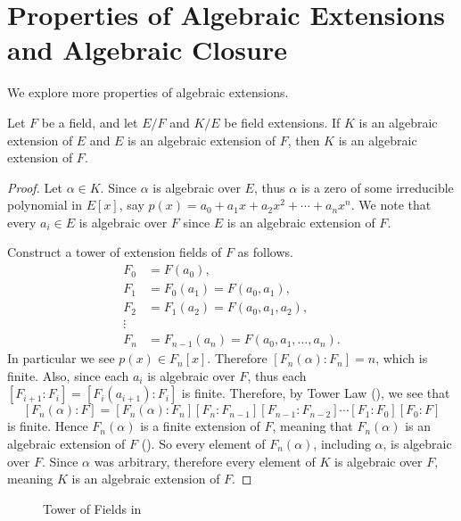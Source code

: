 \section{Properties of Algebraic Extensions and Algebraic Closure}
We explore more properties of algebraic extensions.
\begin{theorem}\label{thrm-algebraic-over-algebraic-is-algebraic}
    Let $F$ be a field, and let $E/F$ and $K/E$ be field extensions. If $K$ is an algebraic extension of $E$ and $E$ is an algebraic extension of $F$, then $K$ is an algebraic extension of $F$.
\end{theorem}
\begin{proof}
    Let $\alpha \in K$. Since $\alpha$ is algebraic over $E$, thus $\alpha$ is a zero of some irreducible polynomial in $E[x]$, say $p(x) = a_0 + a_1x + a_2x^2 + \cdots + a_nx^n$. We note that every $a_i \in E$ is algebraic over $F$ since $E$ is an algebraic extension of $F$.

    Construct a tower of extension fields of $F$ as follows.
    \begin{align*}
        F_0 &= F(a_0),\\
        F_1 &= F_0(a_1) = F(a_0, a_1),\\
        F_2 &= F_1(a_2) = F(a_0, a_1, a_2),\\
        \vdots\\
        F_n &= F_{n-1}(a_n) = F(a_0, a_1, \dots, a_n).
    \end{align*}
    In particular we see $p(x) \in F_n[x]$. Therefore $[F_n(\alpha): F_n] = n$, which is finite. Also, since each $a_i$ is algebraic over $F$, thus each $[F_{i+1}:F_i] = [F_i(a_{i+1}):F_i]$ is finite. Therefore, by Tower Law (), we see that
    \[
        [F_n(\alpha):F] = [F_n(\alpha):F_n][F_n:F_{n-1}][F_{n-1}:F_{n-2}]\cdots[F_1:F_0][F_0:F]
    \]
    is finite. Hence $F_n(\alpha)$ is a finite extension of $F$, meaning that $F_n(\alpha)$ is an algebraic extension of $F$ (). So every element of $F_n(\alpha)$, including $\alpha$, is algebraic over $F$. Since $\alpha$ was arbitrary, therefore every element of $K$ is algebraic over $F$, meaning $K$ is an algebraic extension of $F$.
\end{proof}

\begin{figure}[H]
    \centering
    \caption{Tower of Fields in }
\end{figure}

